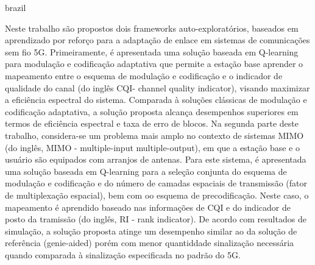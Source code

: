 \begin{resumo}[Resumo]
\begin{otherlanguage*}{brazil}

\setlength\parindent{24pt}
Neste trabalho são propostos dois frameworks auto-exploratórios, baseados em aprendizado por reforço para a adaptação de enlace em sistemas de comunicações sem fio 5G.
%
Primeiramente, é apresentada uma solução baseada em Q-learning para modulação e codificação adaptativa que permite a estação base aprender o mapeamento entre o esquema de modulação e codificação e o indicador de qualidade do canal (do inglês CQI- channel quality indicator), visando maximizar a eficiência espectral do sistema.
%
Comparada à soluções clássicas de modulação e codificação adaptativa, a solução proposta alcança desempenhos superiores em termos de eficiência espectral e taxa de erro de blocos.
%
Na segunda parte deste trabalho, considera-se um problema mais amplo no contexto de sistemas MIMO (do inglês, MIMO - multiple-input multiple-output), em que a estação base e o usuário são equipados com arranjos de antenas.
%
Para este sistema, é apresentada uma solução baseada em Q-learning para a seleção conjunta do esquema de modulação e codificação e do número de camadas espaciais de transmissão (fator de multiplexação espacial), bem com oo esquema de precodificação.
%
Neste caso, o mapeamento é aprendido baseado nas informações de CQI e do indicador de posto da tramissão (do inglês, RI - rank indicator).
%
De acordo com resultados de simulação, a solução proposta atinge um desempenho similar ao da solução de referência (genie-aided) porém com menor quantiddade sinalização necessária quando comparada à sinalização especificada no padrão do 5G.


\end{otherlanguage*}
\end{resumo}
